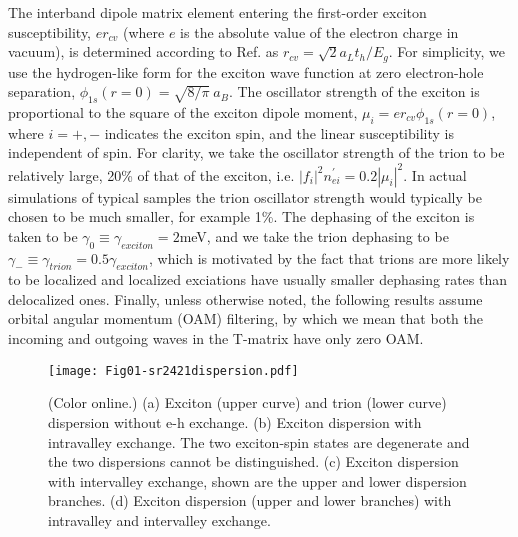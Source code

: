\documentclass[aps,prb,superscriptaddress,letterpaper,amsmath,amssymb,twocolumn,preprintnumbers]{revtex4}
\begin{document}
The interband dipole matrix element entering the first-order exciton susceptibility, $e r_{cv}$ (where $e$ is the absolute value of the electron charge in vacuum),
is  determined according to Ref.  as
$r_{cv} = \sqrt{2} a_L t_h / E_g$.
For simplicity, we use the hydrogen-like form for the exciton wave function at zero electron-hole separation,
$\phi_{1s}(r=0) =  \sqrt{8 / \pi } \ a_B $.
The oscillator strength of the exciton is proportional to the square of the exciton dipole moment,  $\mu_i = e r_{cv} \phi_{1s}(r=0)$,
where $i=+,-$ indicates the exciton spin, and the linear susceptibility is independent of spin.
For clarity, we take the oscillator strength of the trion to be relatively large, 20\% of that of the exciton, i.e.
$|f_i|^2 n_{ei}^{\prime} = 0.2 | \mu_i |^2$.
%
In actual simulations of typical samples the trion oscillator strength would typically be chosen to be much smaller, for example 1\%.
The dephasing of the exciton is taken to be $\gamma_0 \equiv \gamma_{exciton} = 2$meV, and we take the trion dephasing to be
$\gamma_- \equiv \gamma_{trion} = 0.5 \gamma_{exciton}$, which is motivated by the fact that trions are more likely to be localized and localized exciations have usually smaller dephasing rates than delocalized ones.
Finally, unless otherwise noted, the following results assume orbital angular momentum (OAM) filtering, by which we mean that both the incoming and outgoing waves in the T-matrix have only zero OAM.




\begin{figure}
	\centering
	\texttt{[image: Fig01-sr2421dispersion.pdf]}
	\caption{
		(Color online.)
		(a) Exciton (upper curve) and trion (lower curve) dispersion without e-h exchange. (b) Exciton dispersion with intravalley exchange. The two exciton-spin states are degenerate
 and the two dispersions cannot be distinguished. (c) Exciton dispersion with intervalley exchange, shown are the upper and lower dispersion branches. (d) Exciton dispersion (upper and lower branches) with intravalley and intervalley exchange.}	
	\label{fig:sr2421dispersion}
\end{figure}
\end{document}
